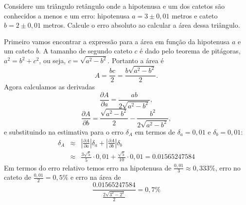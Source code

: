 \begin{ex}
Considere um triângulo retângulo onde a hipotenusa e um dos catetos são conhecidos a menos e um erro: hipotenusa $a=3\pm 0,01$ metros e cateto $b=2\pm 0,01$ metros. Calcule o erro absoluto ao calcular a área dessa triângulo.

Primeiro vamos encontrar a expressão para a área em função da hipotenusa $a$ e um cateto $b$. A tamanho de segundo cateto $c$ é dado pelo teorema de pitágoras, $a^2=b^2+c^2$, ou seja, $c=\sqrt{a^2-b^2}$. Portanto a área é $$
A=\frac{bc}{2}=\frac{b\sqrt{a^2-b^2}}{2}.
$$
Agora calculamos as derivadas
$$
\frac{\partial A}{\partial a}=\frac{ab}{2\sqrt{a^2-b^2}},
$$
$$
\frac{\partial A}{\partial b}=\frac{\sqrt{a^2-b^2}}{2}-\frac{b^2}{2\sqrt{a^2-b^2}},
$$
e substituindo na estimativa para o erro $\delta_A$ em termos de $\delta_a=0,01$ e $\delta_b=0,01$:
\begin{eqnarray*}
\delta_A&\approx & \left|\frac{\partial A}{\partial a}\right|\delta_a+\left|\frac{\partial A}{\partial b}\right|\delta_b\\
&\approx &\frac{3\sqrt{5}}{5}\cdot 0,01+\frac{\sqrt{5}}{10}\cdot 0,01=0.01565247584
\end{eqnarray*}
Em termos do erro relativo temos erro na hipotenusa de $\frac{0,01}{3}\approx 0,333\%$, erro no cateto de $\frac{0,01}{2}= 0,5\%$ e erro na área de
$$
\frac{0.01565247584}{\frac{2\sqrt{3^2-2^2}}{2}}=0,7\%
$$
\end{ex}

